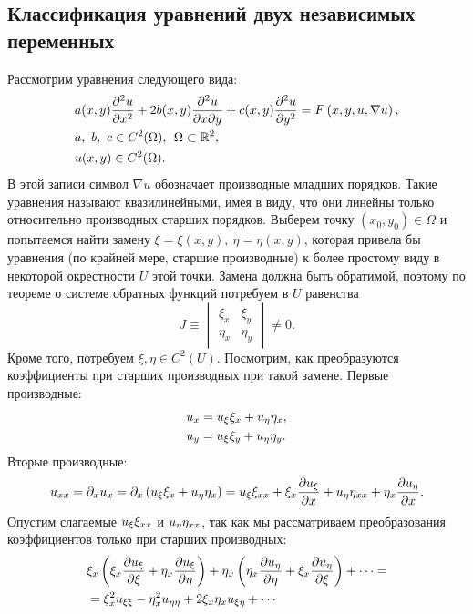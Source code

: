 \subsection{Классификация уравнений двух независимых переменных}
    Рассмотрим уравнения следующего вида:
    \begin{align}
        & a(x, y)\frac{\partial^2u}{\partial{x}^2} + 2b(x,y)\frac{\partial^2u}{\partial x\partial y} + c(x, y)\frac{\partial^2u}{\partial{y}^2} = F\left({x, y, u, \nabla u}\right), \label{lin2} \\
        & a,\ b,\ c \in  C^2(\Omega), \:\: \Omega \subset \mathbb{R}^2, \notag \\
        & u(x,y) \in C^2(\Omega). \notag
    \end{align}
    В этой записи символ $\nabla u$ обозначает производные младших порядков.
    Такие уравнения называют квазилинейными, имея в виду, что они линейны только относительно производных старших порядков.
    Выберем точку $(x_0, y_0) \in \Omega$ и попытаемся найти замену $\xi = \xi(x, y),\ \eta = \eta(x, y)$, которая
    привела бы уравнения (по крайней мере, старшие производные) к более простому виду в некоторой окрестности $U$ этой точки.
    Замена должна быть обратимой, поэтому по теореме о системе обратных функций потребуем в $U$ равенства
    \begin{equation*}
        J \equiv \begin{vmatrix}
            \xi_x & \xi_y \\
            \eta_x & \eta_y
        \end{vmatrix}
        \not= 0.
    \end{equation*}
    Кроме того, потребуем $\xi,\eta \in C^2(U)$. Посмотрим, как преобразуются коэффициенты при старших производных при
    такой замене. Первые производные:
    \begin{align*}
        & u_x = u_{\xi}\xi_x + u_{\eta} \eta_x,\\
        & u_y = u_{\xi}\xi_y + u_{\eta} \eta_y.
    \end{align*}
    Вторые производные:
    \begin{equation*}
        u_{xx} = \partial_x u_x = \partial_x\left({u_{\xi}\xi_x + u_{\eta} \eta_x}\right) = u_{\xi} \xi_{xx} + \xi_x\frac{\partial u_{\xi}}{\partial x} + 
        u_{\eta} \eta_{xx} + \eta_x \frac{\partial u_{\eta}}{\partial x}.
    \end{equation*}
    Опустим слагаемые $ u_{\xi} \xi_{xx} $ и $ u_{\eta} \eta_{xx} $, так как мы рассматриваем преобразования коэффициентов только при старших
    производных:
    \begin{align*}
        & \xi_x\left({\xi_x \frac{\partial u_{\xi}}{\partial\xi} + \eta_x \frac{\partial u_{\xi}}{\partial\eta}}\right) + \eta_x\left({\eta_x\frac{\partial u_{\eta}}{\partial\eta} + \xi_x \frac{\partial u_{\eta}}{\partial\xi}}\right) + \cdots = \\
        & = \xi_x^2 u_{\xi\xi} - \eta_x^2u_{\eta\eta} + 2\xi_x\eta_x u_{\xi\eta} + \cdots
    \end{align*}
